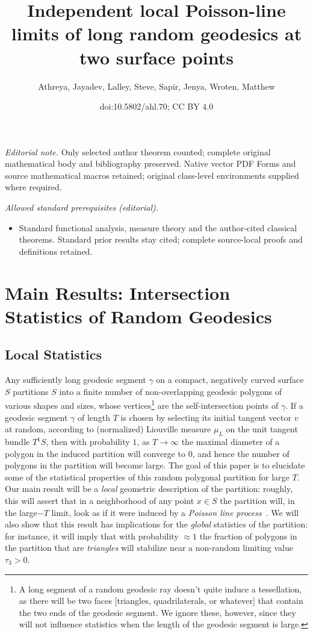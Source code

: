 \documentclass[10pt]{amsart}
\title{Independent local Poisson-line limits of long random geodesics at two surface points}
\author{Athreya, Jayadev, Lalley, Steve, Sapir, Jenya, Wroten, Matthew}
\date{doi:10.5802/ahl.70; CC BY 4.0}
\theoremstyle{definition}\newtheorem{defi}[theo]{Definition}\newtheorem{rema}[theo]{Remark}\newtheorem{exam}[theo]{Example}\newtheorem{exem}[theo]{Example}\newtheorem{nota}[theo]{Notation}
\begin{document}
\maketitle
\noindent\textit{Editorial note.} Only selected author theorem counted; complete original mathematical body and bibliography preserved. Native vector PDF Forms and source mathematical macros retained; original class-level environments supplied where required.\par\medskip
\noindent\textit{Allowed standard prerequisites (editorial).}\begin{itemize}
\item Standard functional analysis, measure theory and the author-cited classical theorems. Standard prior results stay cited; complete source-local proofs and definitions retained.
\end{itemize}\medskip

\section{Main Results: Intersection Statistics of Random Geodesics}\label{sec:local}

\subsection{Local Statistics}\label{ssec:local}
Any sufficiently long geodesic segment $\gamma$ on a compact, negatively curved surface $S$ partitions $S$ into a finite number of non-overlapping geodesic polygons of various shapes and sizes, whose vertices\footnote{A long segment of a random geodesic ray doesn't quite induce a tessellation, as there will be two faces [triangles, quadrilaterals, or whatever] that contain the two ends of the geodesic segment. We ignore these, however, since they will not influence statistics when the length of the geodesic segment is large.} are the self-intersection points of $\gamma$. If a geodesic segment $\gamma$ of length $T$ is chosen by selecting its initial tangent vector $v$ at random, according to (normalized) Liouville measure $\mu_{L}$ on the unit tangent bundle $T^1S$, then with probability $1$, as $T \rightarrow \infty$ the maximal diameter of a polygon in the induced partition will converge to $0$, and hence the number of polygons in the partition will become large. The goal of this paper is to elucidate some of the statistical properties of this random polygonal partition for large $T$. Our main result will be a \emph{local} geometric description of the partition: roughly, this will assert that in a neighborhood of any point $x\in S$ the partition will, in the large$-T$ limit, look as if it were induced by a
\emph{Poisson line process}~\cite{miles:pnas1,miles:pnas2}. We will also show that this result has implications for the \emph{global} statistics of the partition: for instance, it will imply that with probability $\approx 1$ the fraction of polygons in the partition that are \emph{triangles} will stabilize near a non-random limiting value $\tau_{3}>0$.
\end{document}
